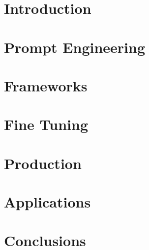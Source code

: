 \section[Intro]{Introduction}




\section[Prompts]{Prompt Engineering}


\section[Frameworks]{Frameworks}








\section[Consult]{Fine Tuning}


\section[Prod]{Production}


\section[Apps]{Applications}


\section[Concl]{Conclusions}



